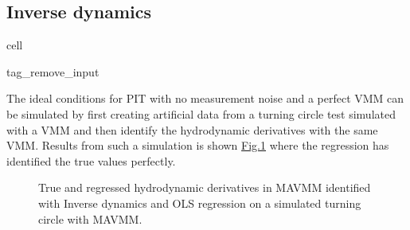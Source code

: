 \documentclass[review]{elsarticle}
\begin{document}
\subsection{Inverse dynamics}
\label{\detokenize{06.40_results_inverse_dynamics:inverse-dynamics}}\label{\detokenize{06.40_results_inverse_dynamics::doc}}
\begin{sphinxuseclass}{cell}
\begin{sphinxuseclass}{tag_remove_input}
\end{sphinxuseclass}
\end{sphinxuseclass}
\sphinxAtStartPar
The ideal conditions for PIT with no measurement noise and a perfect VMM can be simulated by first creating artificial data from a turning circle test simulated with a VMM and then identify the hydrodynamic derivatives with the same VMM. Results from such a simulation is shown \hyperref[\detokenize{06.40_results_inverse_dynamics:fig-bar-parameters}]{Fig.\@ \ref{\detokenize{06.40_results_inverse_dynamics:fig-bar-parameters}}} where the regression has identified the true values perfectly.

\begin{figure}[H]
\centering
\capstart

\noindent{}
\caption{True and regressed hydrodynamic derivatives in MAVMM identified with Inverse dynamics and OLS regression on a simulated turning circle with MAVMM.}\label{\detokenize{06.40_results_inverse_dynamics:fig-bar-parameters}}\end{figure}
\end{document}
